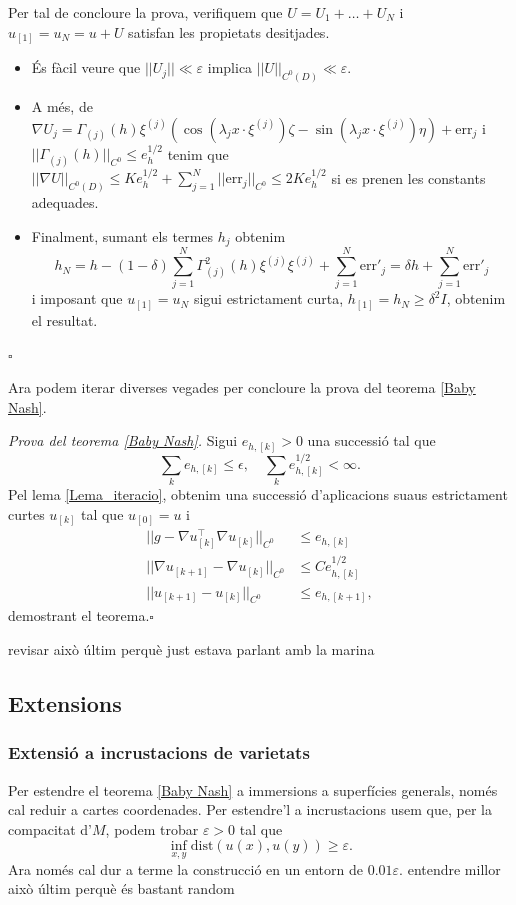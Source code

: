 \documentclass[11pt,a4paper,openright,oneside]{book}
\numberwithin{equation}{section}
\theoremstyle{definition}
\def\qed{\hfill $\square$}
\begin{document}
Per tal de concloure la prova, verifiquem que $U=U_1+\dots+U_N$ i $u_{[1]}=u_N=u+U$ satisfan les propietats desitjades.

\begin{itemize}
    \item És fàcil veure que $||U_j|| \ll \varepsilon$ implica $||U||_{C^0(D)} \ll \varepsilon$.
    \item A més, de $\nabla U_j = \Gamma_{(j)}(h)\xi^{(j)}(\cos(\lambda_j x\cdot\xi^{(j)})\zeta - \sin(\lambda_j x\cdot\xi^{(j)})\eta) + \text{err}_j$ i $||\Gamma_{(j)}(h)||_{C^0} \le e_h^{1/2}$ tenim que $||\nabla U||_{C^0(D)} \le Ke_h^{1/2} + \sum_{j=1}^N ||\text{err}_j||_{C^0} \le 2Ke_h^{1/2}$ si es prenen les constants adequades. 
    \item Finalment, sumant els termes $h_j$ obtenim 
    \begin{equation*}
        h_N = h-(1-\delta)\sum_{j=1}^N \Gamma^2_{(j)}(h)\xi^{(j)}\xi^{(j)} + \sum_{j=1}^N \text{err}'_j = \delta h + \sum_{j=1}^N \text{err}'_j
    \end{equation*}
    i imposant que $u_{[1]} = u_N$ sigui estrictament curta, $h_{[1]}=h_N \ge \delta^2 I$, obtenim el resultat.
\end{itemize}
\qed

Ara podem iterar diverses vegades per concloure la prova del teorema \ref{Baby Nash}.

\textit{Prova del teorema \ref{Baby Nash}.} Sigui $e_{h,[k]}>0$ una successió tal que
$$\sum_{k}e_{h,[k]}\le \epsilon,\quad\sum_{k}e_{h,[k]}^{1/2}<\infty.$$ 
Pel lema \ref{Lema_iteracio}, obtenim una successió d'aplicacions suaus estrictament curtes $u_{[k]}$ tal que $u_{[0]}=u$ i
\begin{equation*}
    \begin{aligned}
    ||g-\nabla u_{[k]}^\intercal\nabla u_{[k]}||_{C^0} &\le e_{h,[k]}\\
    ||\nabla u_{[k+1]}-\nabla u_{[k]}||_{C^0} &\le Ce^{1/2}_{h,[k]}\\
    ||u_{[k+1]}-u_{[k]}||_{C^0} &\le e_{h,[k+1]},
    \end{aligned}
\end{equation*}
demostrant el teorema.\qed

{\color{blue} revisar això últim perquè just estava parlant amb la marina}
\subsection{Extensions}
\subsubsection{Extensió a incrustacions de varietats}
Per estendre el teorema \ref{Baby Nash} a immersions a superfícies generals, només cal reduir a cartes coordenades. Per estendre'l a incrustacions usem que, per la compacitat d'$M$, podem trobar $\varepsilon>0$ tal que 
$$\inf_{x,y} \text{dist}(u(x), u(y))\ge\varepsilon.$$ Ara només cal dur a terme la construcció en un entorn de $0.01\varepsilon$.{\color{blue} entendre millor això últim perquè és bastant random}
\end{document}
